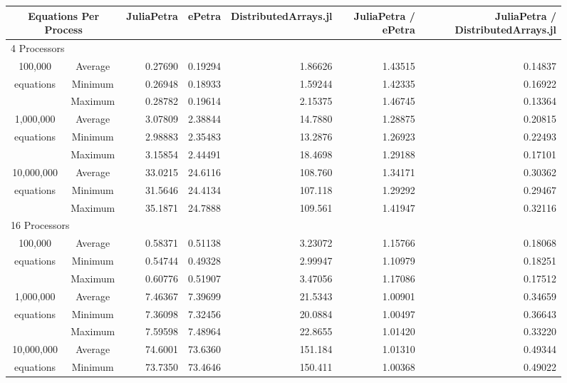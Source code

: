 \documentclass[acmsmall]{acmart}
\begin{document}
\begin{figure}[h]
\begin{tabular}{|c c|r|r|r||r|r|}
	\hline
		\multicolumn{2}{|c|}{Equations Per Process}
		& JuliaPetra
		& ePetra
		& \multicolumn{1}{m{1.8cm}||}{Distributed\-Arrays.jl}
		& \multicolumn{1}{m{1.75cm}|}{JuliaPetra / ePetra}
		& \multicolumn{1}{m{1.8cm}|}{JuliaPetra / Distributed\-Arrays.jl} \\
	\hline
		\multicolumn{7}{|l|}{4 Processors}\\
	\hline
		100,000			&Average & 0.27690 & 0.19294 & 1.86626 & 1.43515 & 0.14837 \\
		equations		&Minimum & 0.26948 & 0.18933 & 1.59244 & 1.42335 & 0.16922 \\
						&Maximum & 0.28782 & 0.19614 & 2.15375 & 1.46745 & 0.13364 \\
	\hline
		1,000,000		&Average & 3.07809 & 2.38844 & 14.7880 & 1.28875 & 0.20815 \\
		equations		&Minimum & 2.98883 & 2.35483 & 13.2876 & 1.26923 & 0.22493 \\
						&Maximum & 3.15854 & 2.44491 & 18.4698 & 1.29188 & 0.17101 \\
	\hline
		10,000,000		&Average & 33.0215 & 24.6116 & 108.760 & 1.34171 & 0.30362 \\
		equations		&Minimum & 31.5646 & 24.4134 & 107.118 & 1.29292 & 0.29467 \\
						&Maximum & 35.1871 & 24.7888 & 109.561 & 1.41947 & 0.32116 \\
	\hline
		\multicolumn{7}{|l|}{16 Processors}\\
	\hline
		100,000			&Average & 0.58371 & 0.51138 & 3.23072 & 1.15766 & 0.18068 \\
		equations		&Minimum & 0.54744 & 0.49328 & 2.99947 & 1.10979 & 0.18251 \\
						&Maximum & 0.60776 & 0.51907 & 3.47056 & 1.17086 & 0.17512 \\
	\hline
		1,000,000		&Average & 7.46367 & 7.39699 & 21.5343 & 1.00901 & 0.34659 \\
		equations		&Minimum & 7.36098 & 7.32456 & 20.0884 & 1.00497 & 0.36643 \\
						&Maximum & 7.59598 & 7.48964 & 22.8655 & 1.01420 & 0.33220 \\
	\hline
		10,000,000		&Average & 74.6001 & 73.6360 & 151.184 & 1.01310 & 0.49344 \\
		equations		&Minimum & 73.7350 & 73.4646 & 150.411 & 1.00368 & 0.49022 \\

\end{tabular}
\end{figure}
\end{document}
